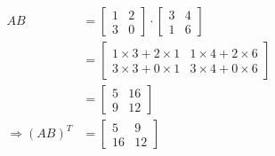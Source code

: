 \begin{solution}
	\begin{align}
	   AB &= \left[ \begin{array}{cc} 1 & 2 \\ 3 & 0\end{array} \right]\cdot
	         \left[ \begin{array}{cc} 3 & 4 \\ 1 & 6 \end{array}\right] \\
	      &= \left[ 
	           \begin{array}{cc}
	              1\times 3 + 2\times 1 & 1\times 4 + 2 \times 6 \\
	              3\times 3 + 0\times 1 & 3\times 4 + 0\times 6 
	           \end{array}
	         \right] \\
	      &= \left[
	           \begin{array}{cc}
	               5 & 16 \\
	               9 & 12
	           \end{array}
	         \right] \\
	     \Rightarrow (AB)^{T} &= \left[
	                                \begin{array}{cc}
	                                   5 & 9 \\
	                                   16 & 12 
	                                \end{array}
	                             \right]
	\end{align}
\end{solution}
